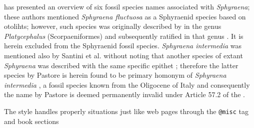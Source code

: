 \documentclass{article}
\begin{document}
\citet{Santini2015} has presented an overview of six fossil species names associated with \textit{Sphyraena}; these authors mentioned \textit{Sphyraena fluctuosa} as a Sphyraenid species based on otolihts; however, such species was originally described by \citet{Nolf1972} in the genus \textit{Platycephalus} (Scorpaeniformes) and subsequently ratified in that genus \citep[e.g.,][]{Huyghebaert1979}. It is herein excluded from the Sphyraenid fossil species. \textit{Sphyraena intermedia} \citealp{Bassani1889} was mentioned also by Santini et al. without noting that another species of extant \textit{Sphyraena} was described with the same specific epithet \citep{Pastore2009}; therefore the latter species by Pastore is herein found to be primary homonym of \textit{Sphyraena intermedia} \citep{Bassani1889}, a fossil species known from the Oligocene of Italy and consequently the name by Pastore is deemed permanently invalid under Article 57.2 of the \citet{ICZN1999}.

The style handles properly situations just like web pages through the \texttt{@misc} tag \citep[e.g., ][]{EschmeyerWeb} and book sections \citep{Switchenska1968,Bohm1924}



\end{document}
